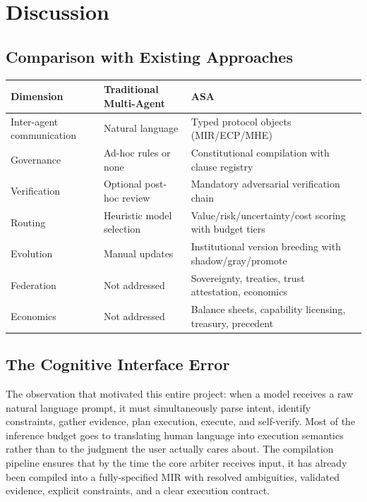 \documentclass[12pt,a4paper]{article}
\begin{document}
\section{Discussion}


\subsection{Comparison with Existing Approaches}


\begin{table}[htbp]
\centering
\small
\begin{tabular}{lll}
\toprule
Dimension & Traditional Multi-Agent & ASA \\
\midrule
Inter-agent communication & Natural language & Typed protocol objects (MIR/ECP/MHE) \\
Governance & Ad-hoc rules or none & Constitutional compilation with clause registry \\
Verification & Optional post-hoc review & Mandatory adversarial verification chain \\
Routing & Heuristic model selection & Value/risk/uncertainty/cost scoring with budget tiers \\
Evolution & Manual updates & Institutional version breeding with shadow/gray/promote \\
Federation & Not addressed & Sovereignty, treaties, trust attestation, economics \\
Economics & Not addressed & Balance sheets, capability licensing, treasury, precedent \\
\bottomrule
\end{tabular}
\end{table}


\subsection{The Cognitive Interface Error}


The observation that motivated this entire project: when a model receives a raw natural language prompt, it must simultaneously parse intent, identify constraints, gather evidence, plan execution, execute, and self-verify. Most of the inference budget goes to translating human language into execution semantics rather than to the judgment the user actually cares about. The compilation pipeline ensures that by the time the core arbiter receives input, it has already been compiled into a fully-specified MIR with resolved ambiguities, validated evidence, explicit constraints, and a clear execution contract.
\end{document}
